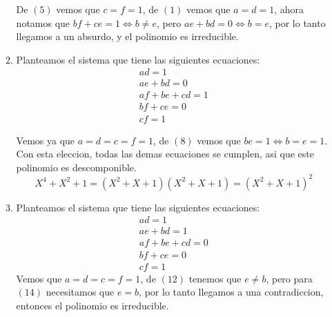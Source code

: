 \begin{enumerate}[label=\roman*)]
\begin{enumerate}[label=(\alph*)]
          De $(5)$ vemos que $c = f = 1$, de $(1)$ vemos que $a = d = 1$, ahora notamos que $bf + ce = 1
          \iff b \neq e$, pero $ae + bd = 0 \iff b = e$, por lo tanto llegamos a un absurdo, y el polinomio es irreducible. 
          \item Planteamos el sistema que tiene las siguientes ecuaciones:
          \begin{align}
          ad = 1 \\
          ae + bd = 0 \\
          af + be + cd = 1 \\
          bf + ce = 0 \\
          cf = 1
          \end{align}

          Vemos ya que $a = d = c = f = 1$, de $(8)$ vemos que $be = 1 \iff b = e = 1$. Con esta eleccion, todas las demas
          ecuaciones se cumplen, asi que este polinomio es descomponible. 
          $$
          X^4 + X^2 + 1 = (X^2 + X + 1)(X^2 + X + 1) = (X^2 + X + 1)^2
          $$
          
          \item Planteamos el sistema que tiene las siguientes ecuaciones:
          \begin{align}
          ad = 1 \\
          ae + bd = 1 \\
          af + be + cd = 0 \\
          bf + ce = 0 \\
          cf = 1
          \end{align}
          Vemos que $a = d = c = f = 1$, de $(12)$ tenemos que $e \neq b$, pero para $(14)$ necesitamos
          que $e = b$, por lo tanto llegamos a una contradiccion, entonces el polinomio es irreducible.
        \end{enumerate}
\end{enumerate}

\begin{aportes}
 \item {}
\end{aportes}
